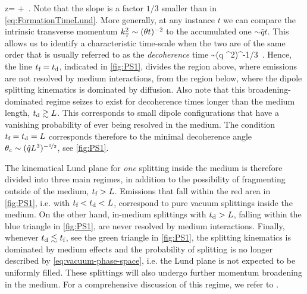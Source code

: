 \beq
\log z\theta =  \log {} + \log {} \,.
\eeq
Note that the slope is a factor $1/3$ smaller than in \eqref{eq:FormationTimeLund}.
More generally, at any instance $t$ we can compare the intrinsic transverse momentum $k_{\text{\tiny T}}^2 \sim (\theta t)^{-2}$ to the accumulated one $\sim \hat q t$. This allows us to identify a characteristic time-scale when the two are of the same order that is usually referred to as the {\sl decoherence} time
\beq
\tdecoh \sim (\hat q \theta^2)^{-1/3} \,.
\eeq
Hence, the line $t_\text{f} = t_\text{d}$, indicated in \autoref{fig:PS1}, divides the region above, where emissions are not resolved by medium interactions, from the region below, where the dipole splitting kinematics is dominated by diffusion.
Also note that this broadening-dominated regime seizes to exist for decoherence times longer than the medium length, $t_\text{d} \gtrsim L$. This corresponds to small dipole configurations that have a vanishing probability of ever being resolved in the medium. The condition $t_\text{f} = t_\text{d} = L$ corresponds therefore to the minimal decoherence angle $\theta_c \sim (\hat q L^3)^{-{\nicefrac{1}{2}}}$, see \autoref{fig:PS1}.


The kinematical Lund plane for {\sl one} splitting inside the medium is therefore divided into three main regimes, in addition to the possibility of fragmenting outside of the medium, $t_\text{f} > L$.
Emissions that fall within the red area in \autoref{fig:PS1}, i.e. with $t_\text{f}< t_\text{d} < L$, correspond to pure vacuum splittings inside the medium. On the other hand, in-medium splittings with $t_\text{d} > L$, falling within the blue triangle in \autoref{fig:PS1}, are never resolved by medium interactions.
Finally, whenever $t_\text{d} \lesssim t_\text{f}$, see the green triangle in \autoref{fig:PS1}, the splitting kinematics is dominated by medium effects and the probability of splitting is no longer described by \autoref{eq:vacuum-phase-space}, i.e. the Lund plane is not expected to be uniformly filled. These splittings will also undergo further momentum broadening in the medium. For a comprehensive discussion of this regime, we refer to \cite{Kurkela:2014tla,Blaizot:2014rla}.

